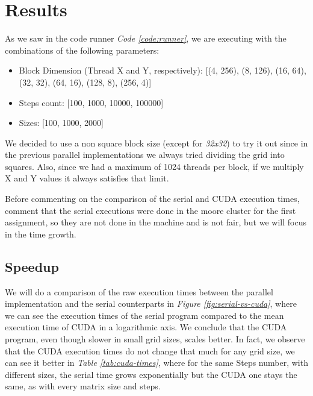 \documentclass[../main.tex]{subfiles}
\begin{document}
\section{Results}

As we saw in the code runner \textit{Code \ref{code:runner}}, we are executing with the combinations of the following parameters:

\begin{itemize}
    \item Block Dimension (Thread X and Y, respectively): [(4, 256), (8, 126), (16, 64), (32, 32), (64, 16), (128, 8), (256, 4)]
    \item Steps count: [100, 1000, 10000, 100000]
    \item Sizes: [100, 1000, 2000]
\end{itemize}

We decided to use a non square block size (except for \textit{32x32}) to try it out since in the previous parallel implementations we always tried dividing the grid into squares. Also, since we had a maximum of 1024 threads per block, if we multiply X and Y values it always satisfies that limit.

Before commenting on the comparison of the serial and CUDA execution times, comment that the serial executions were done in the moore cluster for the first assignment, so they are not done in the machine and is not fair, but we will focus in the time growth.

\subsection{Speedup}

We will do a comparison of the raw execution times between the parallel implementation and the serial counterparts in \textit{Figure \ref{fig:serial-vs-cuda}}, where we can see the execution times of the serial program compared to the mean execution time of CUDA in a logarithmic axis. We conclude that the CUDA program, even though slower in small grid sizes, scales better. In fact, we observe that the CUDA execution times do not change that much for any grid size, we can see it better in \textit{Table \ref{tab:cuda-times}}, where for the same Steps number, with different sizes, the serial time grows exponentially but the CUDA one stays the same, as with every matrix size and steps.
\end{document}
